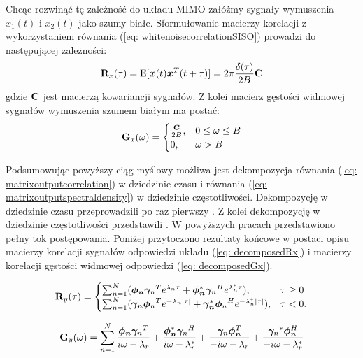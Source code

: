 Chcąc rozwinąć tę zależność do układu MIMO załóżmy sygnały wymuszenia $x_1(t)$ i $x_2(t)$ jako szumy białe. Sformułowanie macierzy korelacji z wykorzystaniem równania (\ref{eq: whitenoisecorrelationSISO}) prowadzi do następującej zależności:
\begin{equation} \label{eq: whitenoisecorrelationMIMO}
	\mathbf{R}_x(\tau)=\mathrm{E}[\bm{x}(t)\bm{x}^T(t+\tau)]=2\pi \frac{\delta(\tau)}{2B}\mathbf{C}
\end{equation} 
gdzie $\mathbf{C}$ jest macierzą kowariancji sygnałów. Z kolei macierz gęstości widmowej sygnałów wymuszenia szumem białym ma postać:
\begin{equation} \label{eq: spectraldensitymatrixWHITENOISE}
	\mathbf{G}_x(\omega)=\begin{cases}
		\frac{\mathbf{C}}{2B}, & 0\le\omega\le B\\
		0, & \omega>B
	\end{cases}
\end{equation} 


Podsumowując powyższy ciąg myślowy możliwa jest dekompozycja równania (\ref{eq: matrixoutputcorrelation}) w dziedzinie czasu i równania (\ref{eq: matrixoutputspectraldensity}) w dziedzinie częstotliwości. Dekompozycję w dziedzinie czasu przeprowadzili po raz pierwszy \cite{James1993,James1995}. Z kolei dekompozycję w dziedzinie częstotliwości przedstawili \cite{Brincker2000,Brincker2001a}. W powyższych pracach przedstawiono pełny tok postępowania. Poniżej przytoczono rezultaty końcowe w postaci opisu macierzy korelacji sygnałów odpowiedzi układu (\ref{eq: decomposedRx}) i macierzy korelacji gęstości widmowej odpowiedzi (\ref{eq: decomposedGx}).

\begin{equation} \label{eq: decomposedRx}
	\mathbf{R}_y(\tau)=\begin{cases}
		\sum_{n=1}^{N} (\bm{\phi_n}{\bm{\gamma}_n}^Te^{\lambda_n \tau} + \bm{\phi_n}^*{\bm{\gamma}_n}^He^{\lambda_n^* \tau}), & \tau\ge 0\\
		\sum_{n=1}^{N} (\bm{\gamma_n}{\bm{\phi}_n}^Te^{-\lambda_n |\tau|} + \bm{\gamma_n}^*{\bm{\phi}_n}^He^{-\lambda_n^* |\tau|}), & \tau< 0.
	\end{cases}
\end{equation} 

\begin{equation} \label{eq: decomposedGx}
	\mathbf{G}_y(\omega)=\sum_{n=1}^{N}\frac{\bm{\phi_n}{\bm{\gamma}_n}^T}{i\omega-\lambda_r}+\frac{\bm{\phi_n}^*{\bm{\gamma}_n}^H}{i\omega-\lambda_r^*}+\frac{{\bm{\gamma}_n}\bm{\phi_n}^T}{-i\omega-\lambda_r}+\frac{{\bm{\gamma}_n}^*\bm{\phi_n}^H}{-i\omega-\lambda_r^*}
\end{equation} 


